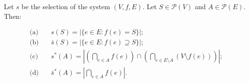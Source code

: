 Let $s$ be the selection of the system $(V, f, E)$. Let $S \in \mathcal{P}(V)$ and $A \in \mathcal{P}(E)$. Then:

\begin{align*}
\text{(a)} \quad & s(S) = |\{e \in E : f(e) = S\}|; \\
\text{(b)} \quad & \bar{s}(S) = |\{e \in E : f(e) \supseteq S\}|; \\
\text{(c)} \quad & s^*(A) = \left|\left(\bigcap_{e \in A} f(e)\right) \cap \left(\bigcap_{e \in E \setminus A} (V \setminus f(e))\right)\right|; \\
\text{(d)} \quad & \bar{s}^*(A) = \left|\bigcap_{e \in A} f(e)\right|.
\end{align*}
